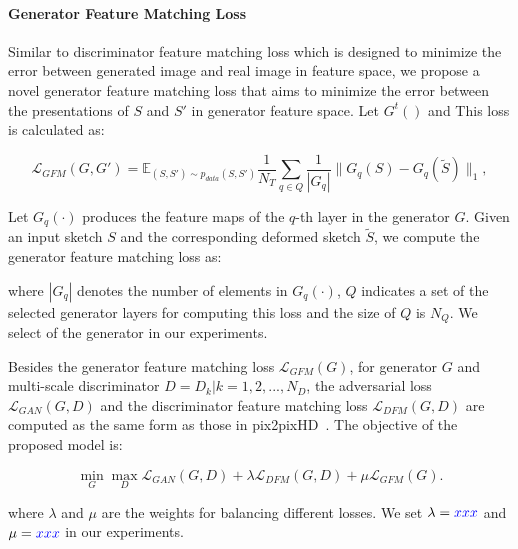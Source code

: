 \paragraph{Generator Feature Matching Loss}
Similar to discriminator feature matching loss which is designed to minimize the error between generated image and real image in feature space, we propose a novel generator feature matching loss that aims to minimize the error between the presentations of $S$ and $S'$ in generator feature space. Let $G^t()$ and This loss is calculated as:

\begin{equation}
\label{eqn:loss_GFM}
\mathcal{L}_{GFM}(G, G')=\mathbb{E}_{(S, S')\sim p_{data}(S, S')} \frac{1}{N_T} \sum_{q\in Q}  \frac{1}{|G_q|} \|G_q(S)-G_q(\tilde{S}) \|_1,
\end{equation}


Let $G_q(\cdot)$ produces the feature maps of the $q$-th layer in the generator $G$.
%
Given an input sketch $S$ and the corresponding deformed sketch $\tilde{S}$, we compute the generator feature matching loss as:


%
where $|G_q|$ denotes the number of elements in $G_q(\cdot)$, $Q$ indicates a set of the selected generator layers for computing this loss and the size of $Q$ is $N_Q$. 
We select  of the generator in our experiments.

Besides the generator feature matching loss $\mathcal{L}_{GFM}(G)$, for generator $G$ and multi-scale discriminator $D={D_k | k=1,2,...,N_D}$, the adversarial loss $\mathcal{L}_{GAN}(G, D)$ and the discriminator feature matching loss $\mathcal{L}_{DFM}(G, D)$ are computed as the same form as those in pix2pixHD~\cite{pix2pixHD}. 
%
The objective of the proposed model is:

\begin{equation}
	\label{eqn:new_minmax_game}
	\min_G \max_{D} \mathcal{L}_{GAN}(G, D)+\lambda \mathcal{L}_{DFM}(G, D) +\mu \mathcal{L}_{GFM}(G).
\end{equation}

where $\lambda$ and $\mu$ are the weights for balancing different losses. We set $\lambda=\textcolor{blue}{xxx}$ and $\mu=\textcolor{blue}{xxx}$ in our experiments.